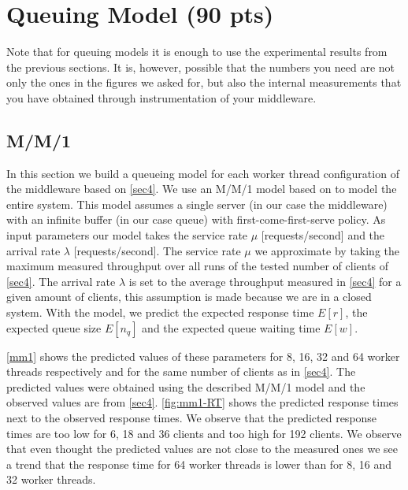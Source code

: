 \documentclass[11pt,a4paper]{article}
\begin{document}
\section{Queuing Model (90 pts)}

Note that for queuing models it is enough to use the experimental results from the previous sections. It is, however, possible that the numbers you need are not only the ones in the figures we asked for, but also the internal measurements that you have obtained through instrumentation of your middleware.

\subsection{M/M/1} \label{sec7.1}
In this section we build a queueing model for each worker thread configuration of the middleware based on \autoref{sec4}. We use an M/M/1 model based on  to model the entire system. This model assumes a single server (in our case the middleware) with an infinite buffer (in our case queue) with first-come-first-serve policy. As input parameters our model takes the service rate $\mu$ [requests/second] and the arrival rate $\lambda$ [requests/second]. The service rate $\mu$ we approximate by taking the maximum measured throughput over all runs of the tested number of clients of \autoref{sec4}. The arrival rate $\lambda$ is set to the average throughput measured in \autoref{sec4} for a given amount of clients, this assumption is made because we are in a closed system.
With the model, we predict the expected response time $E[r]$, the expected queue size $E[n_q]$ and the expected queue waiting time $E[w]$.

\autoref{mm1} shows the predicted values of these parameters for 8, 16, 32 and 64 worker threads respectively and for the same number of clients as in \autoref{sec4}. The predicted values were obtained using the described M/M/1 model and the observed values are from \autoref{sec4}.
\autoref{fig:mm1-RT} shows the predicted response times next to the observed response times. We observe that the predicted response times are too low for 6, 18 and 36 clients and too high for 192 clients. We observe that even thought the predicted values are not close to the measured ones we see a trend that the response time for 64 worker threads is lower than for 8, 16 and 32 worker threads.
\end{document}
